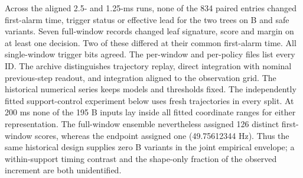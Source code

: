 \documentclass[10pt]{article}
\begin{document}
Across the aligned 2.5- and 1.25-ms runs, none of the 834 paired entries changed first-alarm time, trigger status or effective lead for the two trees on B and safe variants. Seven full-window records changed leaf signature, score and margin on at least one decision. Two of these differed at their common first-alarm time. All single-window trigger bits agreed. The per-window and per-policy files list every ID. The archive distinguishes trajectory replay, direct integration with nominal previous-step readout, and integration aligned to the observation grid. The historical numerical series keeps models and thresholds fixed. The independently fitted support-control experiment below uses fresh trajectories in every split. At 200 ms none of the 195 B inputs lay inside all fitted coordinate ranges for either representation. The full-window ensemble nevertheless assigned 126 distinct first-window scores, whereas the endpoint assigned one (49.75612344 Hz). Thus the same historical design supplies zero B variants in the joint empirical envelope; a within-support timing contrast and the shape-only fraction of the observed increment are both unidentified.
\end{document}
